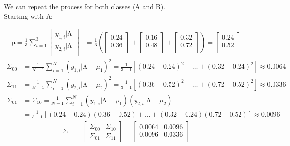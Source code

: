 \documentclass[12pt]{article}
\begin{document}
\begin{enumerate}[leftmargin=\labelsep]
\begin{enumerate}
                We can repeat the process for both classes (A and B).\\
                Starting with A:

                $$
                  \begin{aligned}
                    \boldsymbol{\mu} = \frac{1}{3} \sum^{3}_{i=1} \begin{bmatrix}y_{1,i} | \text{A} \\y_{2,i} | \text{A} \\\end{bmatrix} & =
                    \frac{1}{3}
                    \left(\begin{bmatrix}0.24 \\0.36 \\\end{bmatrix} +
                    \begin{bmatrix}0.16 \\0.48 \\\end{bmatrix} +
                    \begin{bmatrix}0.32 \\0.72 \\\end{bmatrix}\right)
                    = \begin{bmatrix}0.24 \\0.52 \\\end{bmatrix}
                  \end{aligned}
                $$
                $$
                  \begin{aligned}
                    \Sigma_{00} & = \frac{1}{N-1} \sum^{N}_{i=1} (y_{1,i} | \text{A} - \mu_{1})^2 = \frac{1}{3-1} \left[(0.24-0.24)^2 + \dots + (0.32-0.24)^2\right] \approx 0.0064 \\
                    \Sigma_{11} & = \frac{1}{N-1} \sum^{N}_{i=1} (y_{2,i} | \text{A} - \mu_{2})^2 = \frac{1}{3-1} \left[(0.36-0.52)^2 + \dots + (0.72-0.52)^2\right] \approx 0.0336 \\
                    \Sigma_{01} & = \Sigma_{10} = \frac{1}{N-1} \sum^{N}_{i=1} (y_{1,i} | \text{A} - \mu_{1})(y_{2,i} | \text{A} - \mu_{2})                                         \\
                                & = \frac{1}{3-1} \left[(0.24-0.24)(0.36-0.52) + \dots + (0.32-0.24)(0.72-0.52)\right] \approx 0.0096
                  \end{aligned}
                $$
                $$
                  \begin{aligned}
                    \Sigma & = \begin{bmatrix}\Sigma_{00} & \Sigma_{10}\\ \Sigma_{01} & \Sigma_{11}\end{bmatrix} = \begin{bmatrix}0.0064 & 0.0096 \\0.0096 & 0.0336 \\\end{bmatrix}
                  \end{aligned}
                $$


\end{enumerate}
\end{enumerate}
\end{document}

